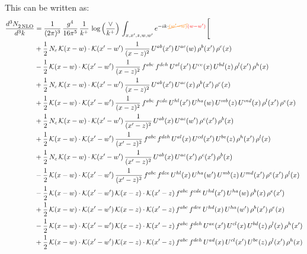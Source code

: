 \documentclass[9pt]{article}
\numberwithin{equation}{section}
\begin{document}
This can be written as:
\begin{align}
 \frac{d^{3}N_{2\,\rm NLO}^{\rm}}{d^{3}k}  & = \frac{1}{(2\pi)^{3}}\,\frac{g^{4}}{16\pi^{5}}\,\frac{1}{k^{+}}\,\log{\left(\frac{\vee}{k^{+}}\right)}\, \int_{x,x',z,w,w'}e^{-ik\cdot{\color{orange}\cancel{(w'-w)}}{\color{red}(w-w')}}\Bigg[\notag\\ & 
+\frac{1}{2}\,N_{c}\,\mathcal{K}(x-w)\cdot\mathcal{K}(x'-w')\,\frac{1}{(x-z)^{2}}\,U^{ab}(x')\,U^{ac}(w)\,\rho^{b}(x')\,\rho^{c}(x)\notag \\ 
&-\frac{1}{2}\,\mathcal{K}(x-w)\cdot\mathcal{K}(x'-w')\,\frac{1}{(x-z)^{2}}\,f^{abc}\,f^{deh}\,U^{al}(x')\,U^{ce}(x)\,U^{bd}(z)\,\rho^{l}(x')\,\rho^{h}(x)\notag \\ 
&+\frac{1}{2}\,N_{c}\,\mathcal{K}(x-w)\cdot\mathcal{K}(x'-w')\,\frac{1}{(x-z)^{2}}\,U^{ab}(x')\,U^{ac}(x)\,\rho^{b}(x')\,\rho^{c}(x)\notag \\ 
&+\frac{1}{2}\,\mathcal{K}(x-w)\cdot\mathcal{K}(x'-w')\,\frac{1}{(x-z)^{2}}\,f^{abc}\,f^{cde}\,U^{hl}(x')\,U^{ha}(w)\,U^{mb}(z)\,U^{md}(x)\,\rho^{l}(x')\,\rho^{e}(x)\notag \\ 
&+\frac{1}{2}\,N_{c}\,\mathcal{K}(x-w)\cdot\mathcal{K}(x'-w')\,\frac{1}{(x'-z)^{2}}\,U^{ab}(x)\,U^{ac}(w')\,\rho^{c}(x')\,\rho^{b}(x)\notag \\ 
&+\frac{1}{2}\,\mathcal{K}(x-w)\cdot\mathcal{K}(x'-w')\,\frac{1}{(x'-z)^{2}}\,f^{abc}\,f^{deh}\,U^{al}(x)\,U^{cd}(x')\,U^{be}(z)\,\rho^{h}(x')\,\rho^{l}(x)\notag \\ 
&+\frac{1}{2}\,N_{c}\,\mathcal{K}(x-w)\cdot\mathcal{K}(x'-w')\,\frac{1}{(x'-z)^{2}}\,U^{ab}(x)\,U^{ac}(x')\,\rho^{c}(x')\,\rho^{b}(x)\notag \\ 
&-\frac{1}{2}\,\mathcal{K}(x-w)\cdot\mathcal{K}(x'-w')\,\frac{1}{(x'-z)^{2}}\,f^{abc}\,f^{dce}\,U^{hl}(x)\,U^{ha}(w')\,U^{mb}(z)\,U^{md}(x')\,\rho^{e}(x')\,\rho^{l}(x)\notag \\ 
&-\frac{1}{2}\,\mathcal{K}(x-w)\cdot\mathcal{K}(x'-w')\,\mathcal{K}(x-z)\cdot\mathcal{K}(x'-z)\,f^{abc}\,f^{cde}\,U^{hd}(x')\,U^{ha}(w)\,\rho^{b}(x)\,\rho^{e}(x')\notag \\ 
&+\frac{1}{2}\,\mathcal{K}(x-w)\cdot\mathcal{K}(x'-w')\,\mathcal{K}(x-z)\cdot\mathcal{K}(x'-z)\,f^{abc}\,f^{dce}\,U^{hd}(x)\,U^{ha}(w')\,\rho^{b}(x')\,\rho^{e}(x)\notag \\ 
&-\frac{1}{2}\,\mathcal{K}(x-w)\cdot\mathcal{K}(x'-w')\,\mathcal{K}(x-z)\cdot\mathcal{K}(x'-z)\,f^{abc}\,f^{deh}\,U^{ae}(x')\,U^{cl}(x)\,U^{bd}(z)\,\rho^{l}(x)\,\rho^{h}(x')\notag \\ 
&+\frac{1}{2}\,\mathcal{K}(x-w)\cdot\mathcal{K}(x'-w')\,\mathcal{K}(x-z)\cdot\mathcal{K}(x'-z)\,f^{abc}\,f^{deh}\,U^{ad}(x)\,U^{cl}(x')\,U^{be}(z)\,\rho^{l}(x')\,\rho^{h}(x)\notag \\ 

\end{align}
\end{document}
